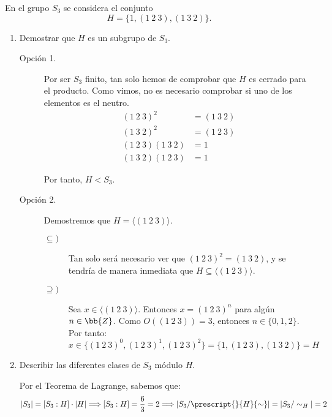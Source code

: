 \begin{ejercicio}\label{ej:3.8}
    En el grupo $S_3$ se considera el conjunto
    \[
        H = \{1, (1\ 2\ 3), (1\ 3\ 2)\}.
    \]
    \begin{enumerate}
        \item Demostrar que $H$ es un subgrupo de $S_3$.
        
        \begin{description}
            \item[Opción 1.]
            
            Por ser $S_3$ finito, tan solo hemos de comprobar que $H$ es cerrado para el producto. Como vimos, no es necesario comprobar si uno de los elementos es el neutro.
            \begin{align*}
                (1\ 2\ 3)^2&=(1\ 3\ 2)\\
                (1\ 3\ 2)^2&=(1\ 2\ 3)\\
                (1\ 2\ 3)(1\ 3\ 2)&=1\\
                (1\ 3\ 2)(1\ 2\ 3)&=1
            \end{align*}

            Por tanto, $H< S_3$.

            \item[Opción 2.] Demostremos que $H=\langle (1\ 2\ 3)\rangle$.
            \begin{description}
                \item[$\subseteq)$] Tan solo será necesario ver que $(1\ 2\ 3)^2=(1\ 3\ 2)$, y se tendría de manera inmediata que $H\subseteq\langle (1\ 2\ 3)\rangle$.
                
                \item[$\supseteq)$] Sea $x\in\langle (1\ 2\ 3)\rangle$. Entonces $x=(1\ 2\ 3)^n$ para algún $n\in\bb{Z}$. Como $O((1\ 2\ 3))=3$, entonces $n\in\{0,1,2\}$. Por tanto:
                \begin{equation*}
                    x\in  \{(1\ 2\ 3)^0, (1\ 2\ 3)^1, (1\ 2\ 3)^2\} = \{1, (1\ 2\ 3), (1\ 3\ 2)\} = H
                \end{equation*}
            \end{description}
        \end{description}
        \item Describir las diferentes clases de $S_3$ módulo $H$.
        
        Por el Teorema de Lagrange, sabemos que:
        \begin{equation*}
            |S_3|=[S_3:H]\cdot |H|\Longrightarrow [S_3:H]=\dfrac{6}{3}=2\Longrightarrow |S_3/\prescript{}{H}{\sim}| = |S_3/\sim_H|=2
        \end{equation*}


\end{enumerate}
\end{ejercicio}
